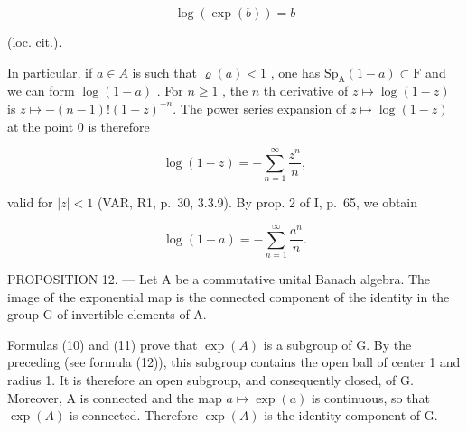 \[
\log (\exp (b)) = b\tag{13}
\]

(loc. cit.).

In particular, if \(a \in A\) is such that \(\varrho(a) < 1\) , one has \(\mathrm{Sp}_{\mathrm{A}}(1 - a) \subset \mathrm{F}\) and we can form \(\log(1 - a)\) . For \(n \geqslant 1\) , the \(n\) th derivative of \(z \mapsto \log(1 - z)\) is \(z \mapsto -(n - 1)! (1 - z)^{-n}\). The power series expansion of \(z \mapsto \log(1 - z)\) at the point 0 is therefore

\[
\log (1 - z) = - \sum_ {n = 1} ^ {\infty} \frac {z ^ {n}}{n},
\]

valid for \(|z| < 1\) (VAR, R1, p.~30, 3.3.9). By prop. 2 of I, p.~65, we obtain

\[
\log (1 - a) = - \sum_ {n = 1} ^ {\infty} \frac {a ^ {n}}{n}.\tag{14}
\]

PROPOSITION 12. --- Let A be a commutative unital Banach algebra. The image of the exponential map is the connected component of the identity in the group G of invertible elements of A.

Formulas (10) and (11) prove that \(\exp(A)\) is a subgroup of G. By the preceding (see formula (12)), this subgroup contains the open ball of center 1 and radius 1. It is therefore an open subgroup, and consequently closed, of G. Moreover, A is connected and the map \(a \mapsto \exp(a)\) is continuous, so that \(\exp(A)\) is connected. Therefore \(\exp(A)\) is the identity component of G.


